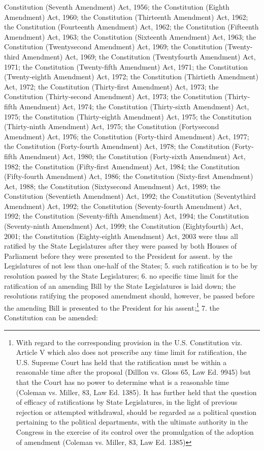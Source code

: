 \begin{multicols}{2}
{Constitution (Seventh Amendment) Act, 1956; the Constitution (Eighth Amendment) Act, 1960; the Constitution
(Thirteenth Amendment) Act, 1962; the Constitution (Fourteenth Amendment) Act, 1962; the Constitution
(Fifteenth Amendment) Act, 1963; the Constitution (Sixteenth Amendment) Act, 1963; the Constitution (Twentysecond Amendment) Act, 1969; the Constitution (Twenty-third Amendment) Act, 1969; the Constitution
(Twentyfourth Amendment) Act, 1971; the Constitution (Twenty-fifth Amendment) Act, 1971; the Constitution
(Twenty-eighth Amendment) Act, 1972; the Constitution (Thirtieth Amendment) Act, 1972; the Constitution
(Thirty-first Amendment) Act, 1973; the Constitution (Thirty-second Amendment) Act, 1973; the Constitution
(Thirty-fifth Amendment) Act, 1974; the Constitution (Thirty-sixth Amendment) Act, 1975; the Constitution
(Thirty-eighth Amendment) Act, 1975; the Constitution (Thirty-ninth Amendment) Act, 1975; the Constitution
(Fortysecond Amendment) Act, 1976; the Constitution (Forty-third Amendment) Act, 1977; the Constitution
(Forty-fourth Amendment) Act, 1978; the Constitution (Forty-fifth Amendment) Act, 1980; the Constitution
(Forty-sixth Amendment) Act, 1982; the Constitution (Fifty-first Amendment) Act, 1984; the Constitution (Fifty-fourth Amendment) Act, 1986; the Constitution (Sixty-first Amendment) Act, 1988; the Constitution (Sixtysecond Amendment) Act, 1989; the Constitution (Seventieth Amendment) Act, 1992; the Constitution
(Seventythird Amendment) Act, 1992; the Constitution (Seventy-fourth Amendment) Act, 1992; the Constitution
(Seventy-fifth Amendment) Act, 1994; the Constitution (Seventy-ninth Amendment) Act, 1999; the Constitution
(Eightyfourth) Act, 2001; the Constitution (Eighty-eighth Amendment) Act, 2003 were thus all ratified by the
State Legislatures after they were passed by both Houses of Parliament before they were presented to the President
for assent.} by the Legislatures of not less than one-half of the States; 5. such ratification is to be by
resolution passed by the State Legislatures; 6. no specific time limit for the ratification of an
amending Bill by the State Legislatures is laid down; the resolutions ratifying the proposed
amendment should, however, be passed before the amending Bill is presented to the President
for his assent;\footnote{With regard to the corresponding provision in the U.S. Constitution viz. Article V which also does not prescribe any time limit for ratification, the U.S. Supreme Court has held that the ratification must be within a reasonable
time after the proposal (Dilllon vs. Gloss 65, Law Ed. 9945) but that the Court has no power to determine what is
a reasonable time (Coleman vs. Miller, 83, Law Ed. 1385). It has further held that the question of efficacy of
ratifications by State Legislatures, in the light of previous rejection or attempted withdrawal, should be regarded
as a political question pertaining to the political departments, with the ultimate authority in the Congress in the
exercise of its control over the promulgation of the adoption of amendment (Coleman vs. Miller, 83, Law Ed.
1385)} 7. the Constitution can be amended:


\end{multicols}
